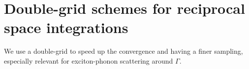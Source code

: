 \section{Double-grid schemes for reciprocal space integrations} \label{sec:double_grids}
We use a double-grid to speed up the convergence and having a finer sampling, especially relevant for exciton-phonon scattering around $\Gamma$.